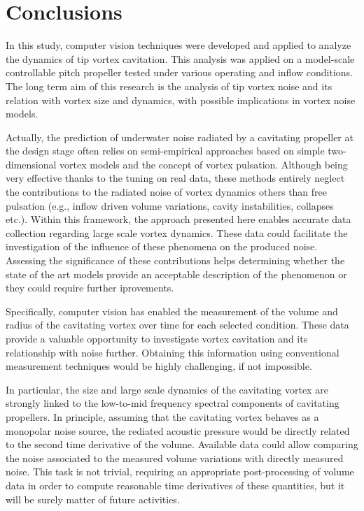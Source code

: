 \section{Conclusions}

In this study, computer vision techniques were developed and applied to analyze the dynamics of tip vortex cavitation.
This analysis was applied on a model-scale controllable pitch propeller tested under various operating and inflow conditions. 
The long term aim of this research is the analysis of tip vortex noise and its relation with vortex size and dynamics, with possible implications in vortex noise models.

Actually, the prediction of underwater noise radiated by a cavitating propeller at the design stage often relies on semi-empirical approaches based on simple two-dimensional vortex models and the concept of vortex pulsation. Although being very effective thanks to the tuning on real data, these methods entirely neglect the contributions to the radiated noise of vortex dynamics others than free pulsation (e.g., inflow driven volume variations, cavity instabilities, collapses etc.).
Within this framework, the approach presented here enables accurate data collection regarding large scale vortex dynamics. These data could facilitate the investigation of the influence of these phenomena on the produced noise.
Assessing the significance of these contributions helps determining whether the state of the art models provide an acceptable description of the phenomenon or they could require further iprovements.

Specifically, computer vision has enabled the measurement of the volume and radius of the cavitating vortex over time for each selected condition. These data provide a valuable opportunity to investigate vortex cavitation and its relationship with noise further.
Obtaining this information using conventional measurement techniques would be highly challenging, if not impossible.

In particular, the size and large scale dynamics of the cavitating vortex are strongly linked to the low-to-mid frequency spectral components of cavitating propellers. 
In principle, assuming that the cavitating vortex behaves as a monopolar noise source, the rediated  acoustic pressure would be directly related to the second time derivative of the volume. Available data could allow comparing the noise associated to the measured volume variations with directly measured noise. 
This task is not trivial, requiring an appropriate post-processing of volume data in order to compute reasonable time derivatives of these quantities, but it will be surely matter of future activities.

